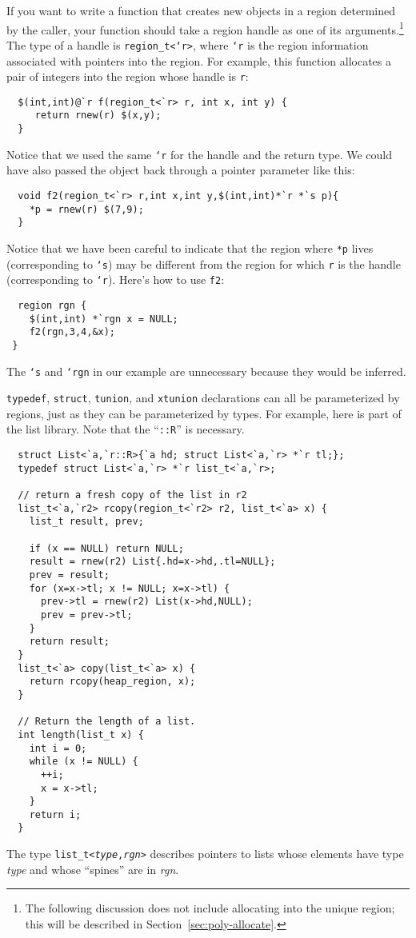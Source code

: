 If you want to write a function that creates new objects in a region
determined by the caller, your function should take a region handle as one
of its arguments.\footnote{The following discussion does not include
allocating into the unique region; this will be described in
Section~\ref{sec:poly-allocate}.}  The type of a handle is
\texttt{region_t<`r>}, where \texttt{`r} is the region information
associated with pointers into the region.  For example, this function
allocates a pair of integers into the region whose handle is \texttt{r}:
\begin{verbatim}
  $(int,int)@`r f(region_t<`r> r, int x, int y) { 
     return rnew(r) $(x,y);
  }
\end{verbatim}
Notice that we used the same \texttt{`r} for the handle and the return
type.  We could have also passed the object back through a pointer
parameter like this:
\begin{verbatim}
  void f2(region_t<`r> r,int x,int y,$(int,int)*`r *`s p){ 
    *p = rnew(r) $(7,9); 
  }
\end{verbatim}

Notice that we have been careful to indicate that the region where
\texttt{*p} lives (corresponding to \texttt{`s}) may be different from
the region for which \texttt{r} is the handle (corresponding to
\texttt{`r}).  Here's how to use \texttt{f2}:
\begin{verbatim}
  region rgn { 
    $(int,int) *`rgn x = NULL; 
    f2(rgn,3,4,&x);
 }
\end{verbatim} %
The \texttt{`s} and \texttt{`rgn} in our example are unnecessary
because they would be inferred.

\texttt{typedef}, \texttt{struct}, \texttt{tunion}, and
\texttt{xtunion} declarations can all be parameterized by regions,
just as they can be parameterized by types.  For example, here is part
of the list library.  Note that the ``\texttt{::R}'' is necessary.
\begin{verbatim}
  struct List<`a,`r::R>{`a hd; struct List<`a,`r> *`r tl;};
  typedef struct List<`a,`r> *`r list_t<`a,`r>;

  // return a fresh copy of the list in r2
  list_t<`a,`r2> rcopy(region_t<`r2> r2, list_t<`a> x) {
    list_t result, prev;

    if (x == NULL) return NULL;
    result = rnew(r2) List{.hd=x->hd,.tl=NULL};
    prev = result;
    for (x=x->tl; x != NULL; x=x->tl) {
      prev->tl = rnew(r2) List(x->hd,NULL);
      prev = prev->tl;
    }
    return result;
  }  
  list_t<`a> copy(list_t<`a> x) {
    return rcopy(heap_region, x);
  }

  // Return the length of a list. 
  int length(list_t x) {
    int i = 0;
    while (x != NULL) {
      ++i;
      x = x->tl;
    }
    return i;
  }
\end{verbatim}
The type \texttt{list_t<\textit{type},\textit{rgn}>} describes
pointers to lists whose elements have type \textit{type} and whose
``spines'' are in \textit{rgn}.  

